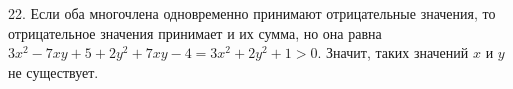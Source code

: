 22. Если оба многочлена одновременно принимают отрицательные значения, то отрицательное значения принимает и их сумма, но она равна $3x^2-7xy+5+2y^2+7xy-4=
3x^2+2y^2+1>0.$ Значит, таких значений $x$ и $y$ не существует.\\

